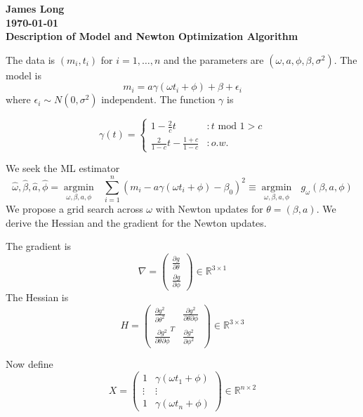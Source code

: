 \documentclass[12pt]{article}
\title{}
\date{}
\author{}
\newcommand{\argmin}[1]{\underset{#1}{\operatorname{argmin}}\text{ }}
\begin{document}
\noindent
\textbf{James Long}\\
\textbf{\today}\\
\textbf{Description of Model and Newton Optimization Algorithm}

The data is $(m_i,t_i)$ for $i=1,\ldots,n$ and the parameters are $(\omega,a,\phi,\beta,\sigma^2)$. The model is
\begin{equation*}
m_i = a\gamma(\omega t_i + \phi) + \beta + \epsilon_i
\end{equation*}
where $\epsilon_i \sim N(0,\sigma^2)$ independent. The function $\gamma$ is 

\begin{equation*}
  \gamma(t) =    \left\{
  \begin{array}{lr}
    1 - \frac{2}{c}t &:  t \text{ mod } 1 > c\\ 
    \frac{2}{1-c}t - \frac{1+c}{1-c}  &: o.w.
  \end{array} \right.
\end{equation*}

We seek the ML estimator
\begin{equation*}
\widehat{\omega},\widehat{\beta},\widehat{a},\widehat{\phi} = \argmin{\omega,\beta,a,\phi} \sum_{i=1}^n (m_i - a\gamma(\omega t_i + \phi) - \beta_0)^2 \equiv \argmin{\omega,\beta,a,\phi} g_\omega(\beta,a,\phi)
\end{equation*}
We propose a grid search across $\omega$ with Newton updates for $\theta = (\beta,a)$. We derive the Hessian and the gradient for the Newton updates. 

The gradient is
\begin{equation*}
\nabla = \begin{pmatrix}
\frac{\partial g}{\partial \theta} \\
\frac{\partial g}{\partial \phi}
\end{pmatrix} \in \mathbb{R}^{3 \times 1}
\end{equation*}
The Hessian is
\begin{equation*}
H = \begin{pmatrix}
\frac{\partial g^2}{\partial \theta^2} & \frac{\partial g^2}{\partial \theta \partial \phi} \\
\frac{\partial g^2}{\partial \theta \partial \phi}^T  & \frac{\partial g^2}{\partial \phi^2} 
\end{pmatrix} \in \mathbb{R}^{3 \times 3}
\end{equation*}



Now define
\begin{equation*}
X = \begin{pmatrix}
1 & \gamma(\omega t_1 + \phi) \\
\vdots & \vdots\\
1 & \gamma(\omega t_n + \phi)
\end{pmatrix} \in \mathbb{R}^{n \times 2}
\end{equation*}
\end{document}

